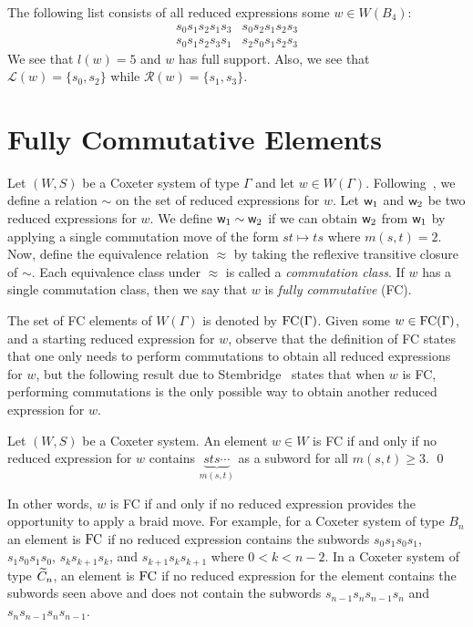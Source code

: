 \begin{example}
The following list consists of all reduced expressions some $w \in W(B_4)$:
$$\begin{array}{ll}
s_0s_1s_2s_1s_3 & s_0s_2s_1s_2s_3\\
s_0s_1s_2s_3s_1 & s_2s_0s_1s_2s_3	
\end{array}$$
We see that $l(w)=5$ and $w$ has full support. Also, we see that $\mathcal{L}(w)=\{s_0, s_2\}$ while $\mathcal{R}(w)=\{s_1, s_3\}$.	
\end{example}



\section{Fully Commutative Elements}\label{sec:FC}
Let $(W,S)$ be a Coxeter system of type $\Gamma$ and let $w \in W(\Gamma)$. Following~\cite{Stembridge1996}, we define a relation $\sim$ on the set of reduced expressions for $w$. Let $\mathsf{w}_1$ and $\mathsf{w}_2$ be two reduced expressions for $w$. We define $\mathsf{w}_1 \sim \mathsf{w}_2$ if we can obtain $\mathsf{w}_2$ from $\mathsf{w}_1$ by applying a single commutation move of the form $st \mapsto ts$ where $m(s,t)=2$. Now, define the equivalence relation $\approx$ by taking the reflexive transitive closure of $\sim$. Each equivalence class under $\approx$ is called a \emph{commutation class}. If $w$ has a single commutation class, then we say that $w$ is \emph{fully commutative} (FC). 

The set of FC elements of $W(\Gamma)$ is denoted by $\mathrm{FC}(\Gamma)$. Given some $w \in \mathrm{FC}(\Gamma)$, and a starting reduced expression for $w$, observe that the definition of FC states that one only needs to perform commutations to obtain all reduced expressions for $w$, but the following result due to Stembridge~\cite{Stembridge1996} states that when $w$ is FC, performing commutations is the only possible way to obtain another reduced expression for $w$.

\begin{proposition}\label{thm:Stembridge}
	Let $(W,S)$ be a Coxeter system. An element $w \in W$ is FC if and only if no reduced expression for $w$ contains $\underbrace{sts\cdots}_{m(s,t)}$ as a subword for all $m(s,t) \geq 3$. \qed
\end{proposition}

In other words, $w$ is FC if and only if no reduced expression provides the opportunity to apply a braid move. For example, for a Coxeter system of type $B_n$ an element is $\mathrm{FC}$ if no reduced expression contains the subwords $s_0s_1s_0s_1$, $s_1s_0s_1s_0$, $s_ks_{k+1}s_k$, and $s_{k+1}s_ks_{k+1}$ where $0<k<n-2$. In a Coxeter system of type $\widetilde{C}_n$, an element is $\mathrm{FC}$ if no reduced expression for the element contains the subwords seen above and does not contain the subwords $s_{n-1}s_ns_{n-1}s_n$ and $s_{n}s_{n-1}s_ns_{n-1}$.

